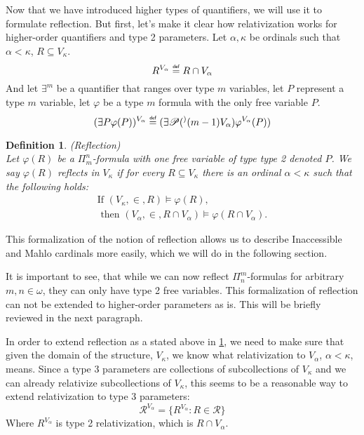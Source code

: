 \documentclass[12pt,a4paper]{article}
\newtheorem{definition}[theorem]{Definition}
\newcommand{\power}[1]{\ensuremath{\mathscr{P}} (#1)}
\newcommand{\sub}{\subseteq}
\newcommand\defeq{\mathrel{\overset{\makebox[0pt]{\mbox{\normalfont\tiny\sffamily def}}}{=}}}
\begin{document}
Now that we have introduced higher types of quantifiers, we will use it to formulate reflection. But first, let's make it clear how relativization works for higher-order quantifiers and type 2 parameters. Let $\alpha, \kappa$ be ordinals such that $\alpha < \kappa$, $R \subseteq V_\kappa$.
\begin{equation}
R^{V_\alpha} \defeq R \cap V_\alpha
\end{equation}
And let $\exists^{m}$ be a quantifier that ranges over type $m$ variables, let $P$ represent a type $m$ variable, let $\varphi$ be a type $m$ formula with the only free variable $P$.
\begin{equation}
(\exists P \varphi(P))^{V_\alpha} \defeq (\exists \power^(m-1){V_\alpha})\varphi^{V_\alpha}(P))
\end{equation}


\begin{definition}{(Reflection)}\label{def:reflection_2}\\
Let $\varphi(R)$ be a $\Pi^n_m$-formula with one free variable of type type 2 denoted $P$. We say $\varphi(R)$ reflects in $V_\kappa$ if for every $R \sub V_\kappa$ there is an ordinal $\alpha<\kappa$ such that the following holds:
\begin{equation}
\begin{gathered}
\mbox{If }(V_\kappa,\in, R)\models \varphi(R),\\
\mbox{ then }(V_\alpha,\in, R\cap V_\alpha) \models \varphi(R\cap V_\alpha).
\end{gathered}
\end{equation}
\end{definition}

This formalization of the notion of reflection allows us to describe Inaccessible and Mahlo cardinals more easily, which we will do in the following section. 

It is important to see, that while we can now reflect $\Pi^m_n$-formulas for arbitrary $m, n \in \omega$, they can only have type 2 free variables. 
This formalization of reflection can not be extended to higher-order parameters as is. This will be briefly reviewed in the next paragraph.

In order to extend reflection as a stated above in \ref{def:reflection_2}, we need to make sure that given the domain of the structure, $V_\kappa$, we know what relativization to $V_\alpha$, $\alpha < \kappa$, means.
Since a type 3 parameters are collections of subcollections of $V_\kappa$ and we can already relativize subcollections of $V_\kappa$, this seems to be a reasonable way to extend relativization to type 3 parameters:
\begin{equation}
\mathscr{R}^{V_\alpha} = \{R^{V_\alpha} : R \in \mathscr{R} \}
\end{equation}
Where $R^{V_\alpha}$ is type 2 relativization, which is $R \cap V_\alpha$.
\end{document}
